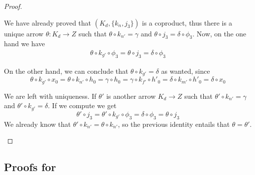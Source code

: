 \documentclass[a4paper,UKenglish,cleveref,pdftex,thm-restate,numberwithinsect]{lipics-v2021}
\begin{document}
\begin{proof}
\begin{enumerate}
 We have already proved that $(K_d, \{k_n, j_3\})$ is a coproduct, thus there is a unique arrow $\theta\colon K_d\to Z$ such that  $\theta \circ k_{n'}=\gamma$ and $\theta \circ j_3=\delta \circ \phi_3 $.
 Now, on the one hand we have
 \begin{align*}
 	\theta \circ k_{g'}\circ \phi_3=\theta \circ  j_3=\delta\circ \phi_3 
 \end{align*}
 
 On the other hand, we can conclude that $\theta \circ k_{g'}=\delta$ as wanted, since
 \[\theta \circ k_{g'}\circ x_0=\theta \circ k_{n'}\circ h_0=\gamma \circ h_0=\gamma \circ k_{f'}\circ h'_0=\delta \circ k_{m'}\circ h'_0=\delta \circ x_0 \]
 
 
 We are left with uniqueness. If $\theta'$ is another arrow $K_d\to Z$ such that $\theta'\circ k_{n'}=\gamma$ and $\theta'\circ k_{g'}= \delta$. If we compute we get
 \[\theta'\circ j_3=\theta'\circ k_{g'}\circ \phi_3=\delta \circ \phi_3=\theta \circ j_3 \]
 We already know that $\theta'\circ k_{n'}=\theta \circ k_{n'}$, so the previous identity entails that $\theta =\theta'$.
			 \qedhere 
	\end{enumerate}
\end{proof}




\subsection{Proofs for }\label{app:due}
\fhyp*
\end{document}
